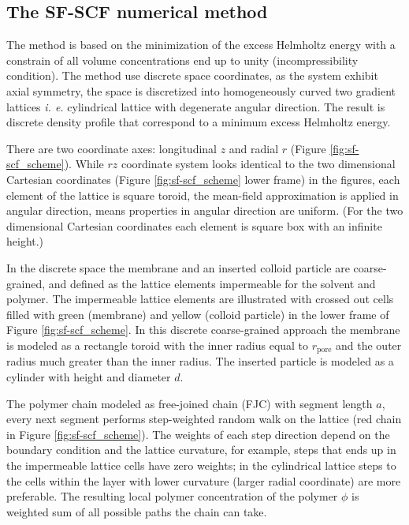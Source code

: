 \documentclass[12pt, a4paper]{article}
\begin{document}
\subsection*{The SF-SCF numerical method}

The method is based on the minimization of the excess Helmholtz energy with a constrain of all volume concentrations end up to unity (incompressibility condition).
The method use discrete space coordinates, as the system exhibit axial symmetry, the space is discretized into homogeneously curved two gradient lattices \emph{i. e.} cylindrical lattice with degenerate angular direction.
The result is discrete density profile that correspond to a minimum excess Helmholtz energy.

There are two coordinate axes: longitudinal $z$ and radial $r$ (Figure \ref{fig:sf-scf_scheme}). 
While $rz$ coordinate system looks identical to the two dimensional Cartesian coordinates (Figure \ref{fig:sf-scf_scheme} lower frame) in the figures, each element of the lattice is square toroid, the mean-field approximation is applied in angular direction, means properties in angular direction are uniform.
(For the two dimensional Cartesian coordinates each element is square box with an infinite height.)

In the discrete space the membrane and an inserted colloid particle are coarse-grained, and defined as the lattice elements impermeable for the solvent and polymer.
The impermeable lattice elements are illustrated with crossed out cells filled with green (membrane) and yellow (colloid particle) in  the lower frame of Figure \ref{fig:sf-scf_scheme}.
In this discrete coarse-grained approach the membrane is modeled as a rectangle toroid with the inner radius equal to $r_{\textrm{pore}}$ and the outer radius much greater than the inner radius.
The inserted particle is modeled as a cylinder with height and diameter $d$.

The polymer chain modeled as free-joined chain (FJC) with segment length $a$, every next segment performs step-weighted random walk on the lattice (red chain in Figure \ref{fig:sf-scf_scheme}).
The weights of each step direction depend on the boundary condition and the lattice curvature, for example, steps that ends up in the impermeable lattice cells have zero weights; in the cylindrical lattice steps to the cells within the layer with lower curvature (larger radial coordinate) are more preferable.
The resulting local polymer concentration of the polymer $\phi$ is weighted sum of all possible paths the chain can take.
\end{document}

